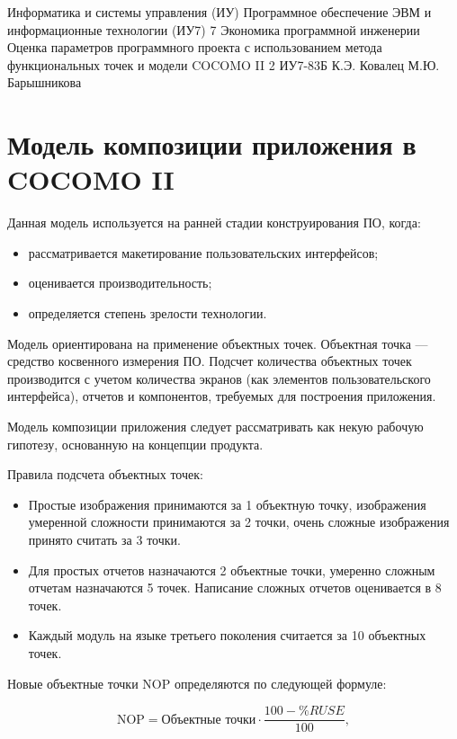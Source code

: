 \documentclass{bmstu}
\begin{document}
\makereporttitle
{Информатика и системы управления (ИУ)}
{Программное обеспечение ЭВМ и информационные технологии (ИУ7)}
{7}
{Экономика программной инженерии}
{Оценка параметров программного проекта с использованием метода функциональных точек и модели COCOMO II}
{2}
{ИУ7-83Б}
{К.Э. Ковалец}
{М.Ю. Барышникова}


\setcounter{page}{2}

\section*{Модель композиции приложения в COCOMO II}

Данная модель используется на ранней стадии конструирования ПО, когда:
\begin{itemize}
    \item рассматривается макетирование пользовательских интерфейсов;
    \item оценивается производительность;
    \item определяется степень зрелости технологии.
\end{itemize}

Модель ориентирована на применение объектных точек. Объектная точка ---
средство косвенного измерения ПО. Подсчет количества объектных точек
производится с учетом количества экранов (как элементов пользовательского
интерфейса), отчетов и компонентов, требуемых для построения приложения.

Модель композиции приложения следует рассматривать как некую рабочую
гипотезу, основанную на концепции продукта.

Правила подсчета объектных точек:
\begin{itemize}
    \item Простые изображения принимаются за 1 объектную точку, изображения умеренной сложности принимаются за 2 точки, очень сложные изображения принято считать за 3 точки.
    \item Для простых отчетов назначаются 2 объектные точки, умеренно сложным отчетам
    назначаются 5 точек. Написание сложных отчетов оценивается в 8 точек.
    \item Каждый модуль на языке третьего поколения считается за 10 объектных точек.
\end{itemize}

Новые объектные точки NOP определяются по следующей формуле:

\begin{equation}
    \text{NOP} = \text{Объектные точки} \cdot  \frac{100 - \%RUSE}{100},
\end{equation}
\end{document}
